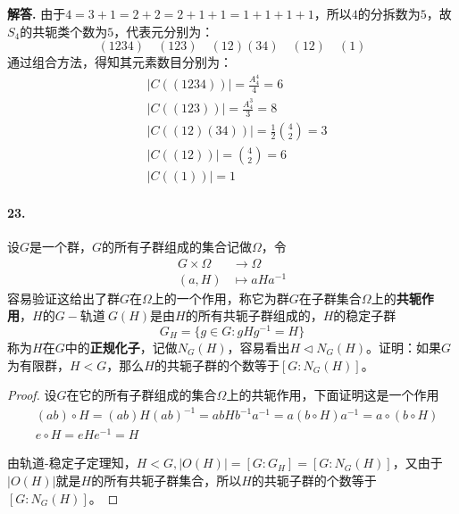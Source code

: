 \documentclass[12pt, a4paper, oneside]{ctexart}
\newenvironment{solution}{\par\noindent\textbf{解答. }}{\bigskip\par}
\begin{document}
\begin{solution}
    由于$4 = 3+1 = 2+2 = 2+1+1 = 1+1+1+1$，所以$4$的分拆数为$5$，故$S_4$的共轭类个数为$5$，代表元分别为：
    \begin{equation*}
        (1234)\quad(123)\quad(12)(34)\quad(12)\quad(1)
    \end{equation*}
    通过组合方法，得知其元素数目分别为：
    \begin{equation*}
        \begin{aligned}
            &|C((1234))| = \frac{A_4^4}{4} = 6\\
            &|C((123))| = \frac{A_4^3}{3} = 8\\
            &|C((12)(34))| = \frac{1}{2}\binom{4}{2} = 3\\
            &|C((12))| = \binom{4}{2} = 6\\
            &|C((1))| = 1
        \end{aligned}
    \end{equation*}
\end{solution}
\paragraph{23.}设$G$是一个群，$G$的所有子群组成的集合记做$\Omega$，令
\begin{equation*}
    \begin{aligned}
        G\times\Omega&\rightarrow \Omega\\
        (a,H)&\mapsto aHa^{-1}
    \end{aligned}
\end{equation*}
容易验证这给出了群$G$在$\Omega$上的一个作用，称它为群$G$在子群集合$\Omega$上的\textbf{共轭作用}，$H$的$G-\text{轨道}\ G(H)$是由$H$的所有共轭子群组成的，$H$的稳定子群
\begin{equation*}
    G_H = \{g\in G:gHg^{-1} = H\}
\end{equation*}
称为$H$在$G$中的\textbf{正规化子}，记做$N_G(H)$，容易看出$H\triangleleft N_G(H)$。证明：如果$G$为有限群，$H<G$，那么$H$的共轭子群的个数等于$[G:N_G(H)]$。
\begin{proof}
    设$G$在它的所有子群组成的集合$\Omega$上的共轭作用，下面证明这是一个作用
    \begin{equation*}
        \begin{aligned}
            &(ab)\circ H = (ab)H(ab)^{-1} = abHb^{-1}a^{-1} = a(b\circ H)a^{-1} = a\circ(b\circ H)\\
            &e\circ H = eHe^{-1} = H
        \end{aligned}
    \end{equation*}

    由$\text{轨道-稳定子定理}$知，$H < G, |O(H)| = [G: G_H] = [G:N_G(H)]$，又由于$|O(H)|$就是$H$的所有共轭子群集合，所以$H$的共轭子群的个数等于$[G:N_G(H)]$。
\end{proof}
\end{document}

